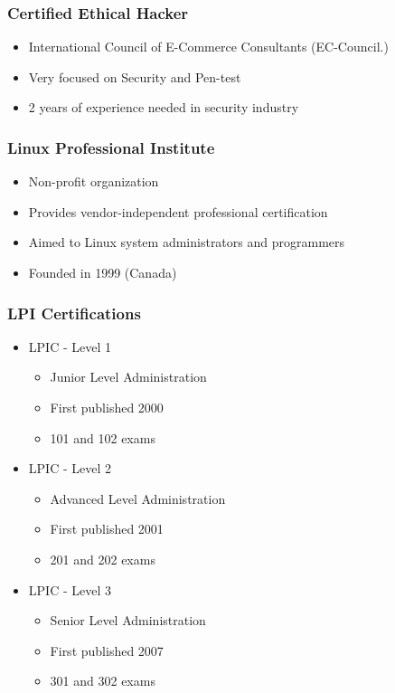 \documentclass{beamer}
\begin{document}

\begin{frame}
\frametitle{Certified Ethical Hacker}
\begin{itemize}
\item International Council of E-Commerce Consultants (EC-Council.) 
\item Very focused on Security and Pen-test
\item 2 years of experience needed in security industry
\end{itemize}
\end{frame}



\begin{frame}
\frametitle{Linux Professional Institute}
\begin{itemize}
\item Non-profit organization 
\item Provides vendor-independent professional certification
\item Aimed to Linux system administrators and programmers
\item Founded in 1999 (Canada)
\end{itemize}
\end{frame}


\begin{frame}
\frametitle{LPI Certifications}
\begin{itemize}
\item LPIC - Level 1
    \begin{itemize}
    \item Junior Level Administration
    \item First published 2000 
    \item 101 and 102 exams
    \end{itemize}
\item LPIC - Level 2
    \begin{itemize}
    \item Advanced Level Administration
    \item First published 2001 
    \item 201 and 202 exams
    \end{itemize}
\item LPIC - Level 3
    \begin{itemize}
    \item Senior Level Administration
    \item First published 2007 
    \item 301 and 302 exams
    \end{itemize}
\end{itemize}
\end{frame}
\end{document}
